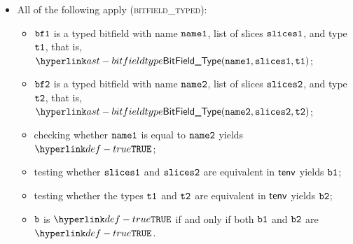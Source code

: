 \begin{itemize}
  \item All of the following apply (\textsc{bitfield\_typed}):
  \begin{itemize}
    \item $\texttt{bf1}$ is a typed bitfield with name $\texttt{name1}$, list of slices $\texttt{slices1}$, and type $\texttt{t1}$, that is,
          $\BitFieldType(\nameone, \slicesone, \vtone)$;
    \item $\texttt{bf2}$ is a typed bitfield with name $\texttt{name2}$, list of slices $\texttt{slices2}$, and type $\texttt{t2}$, that is,
          $\BitFieldType(\nametwo, \slicestwo, \vttwo)$;
    \item checking whether $\texttt{name1}$ is equal to $\texttt{name2}$ yields $\True$\ProseTerminateAs{\False};
    \item testing whether $\texttt{slices1}$ and $\texttt{slices2}$ are equivalent in $\textsf{tenv}$ yields $\texttt{b1}$\ProseOrTypeError;
    \item testing whether the types $\texttt{t1}$ and $\texttt{t2}$ are equivalent in $\textsf{tenv}$ yields $\texttt{b2}$\ProseOrTypeError;
    \item $\texttt{b}$ is $\True$ if and only if both $\texttt{b1}$ and $\texttt{b2}$ are $\True$.
  \end{itemize}
\end{itemize}

